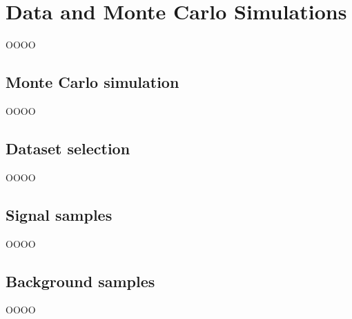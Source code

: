 \chapter{Data and Monte Carlo Simulations}
\label{chap:chapter-5}

OOOO

\section{Monte Carlo simulation}
\label{heading:Chapters-CH5-2}

OOOO

\section{Dataset selection}
\label{heading:Chapters-CH5-3}

OOOO

\section{Signal samples}
\label{heading:Chapters-CH5-4}

OOOO

\section{Background samples}
\label{heading:Chapters-CH5-5}

OOOO

